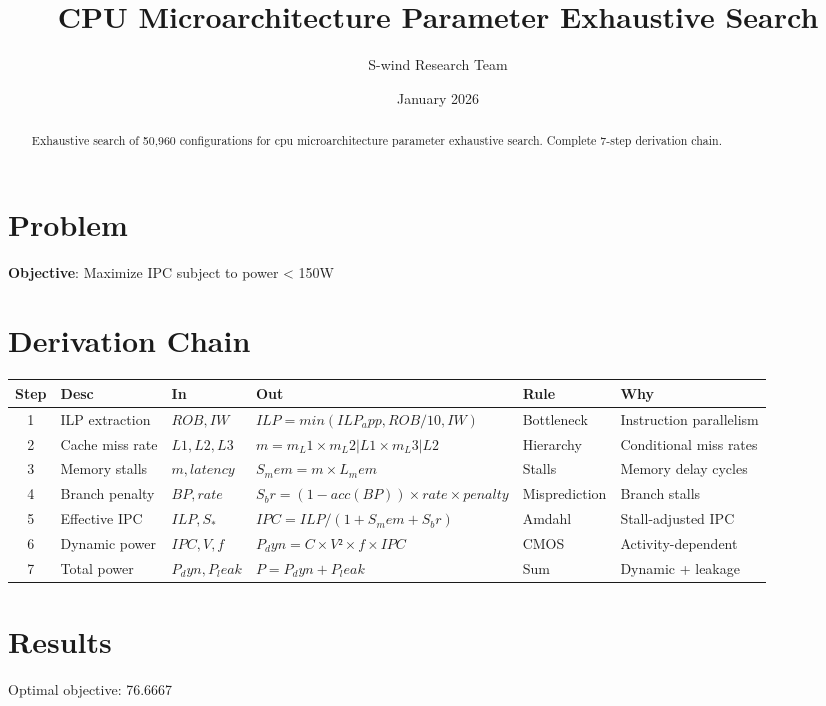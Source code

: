 \documentclass[11pt]{article}
\title{CPU Microarchitecture Parameter Exhaustive Search}
\author{S-wind Research Team}
\date{January 2026}
\begin{document}
\maketitle

\begin{abstract}
Exhaustive search of 50,960 configurations for cpu microarchitecture parameter exhaustive search. Complete 7-step derivation chain.
\end{abstract}

\section{Problem}
\textbf{Objective}: Maximize IPC subject to power < 150W

\section{Derivation Chain}
\begin{longtable}{|c|p{2cm}|p{2cm}|p{3cm}|p{2cm}|p{3cm}|}
\hline
Step & Desc & In & Out & Rule & Why\\\hline\endhead
1 & ILP extraction & $ROB, IW$ & $ILP = min(ILP_app, ROB/10, IW)$ & Bottleneck & Instruction parallelism\\\hline
2 & Cache miss rate & $L1, L2, L3$ & $m = m_L1×m_L2|L1×m_L3|L2$ & Hierarchy & Conditional miss rates\\\hline
3 & Memory stalls & $m, latency$ & $S_mem = m × L_mem$ & Stalls & Memory delay cycles\\\hline
4 & Branch penalty & $BP, rate$ & $S_br = (1-acc(BP))×rate×penalty$ & Misprediction & Branch stalls\\\hline
5 & Effective IPC & $ILP, S_*$ & $IPC = ILP/(1 + S_mem + S_br)$ & Amdahl & Stall-adjusted IPC\\\hline
6 & Dynamic power & $IPC, V, f$ & $P_dyn = C×V²×f×IPC$ & CMOS & Activity-dependent\\\hline
7 & Total power & $P_dyn, P_leak$ & $P = P_dyn + P_leak$ & Sum & Dynamic + leakage\\\hline
\end{longtable}

\section{Results}
Optimal objective: 76.6667
\end{document}
